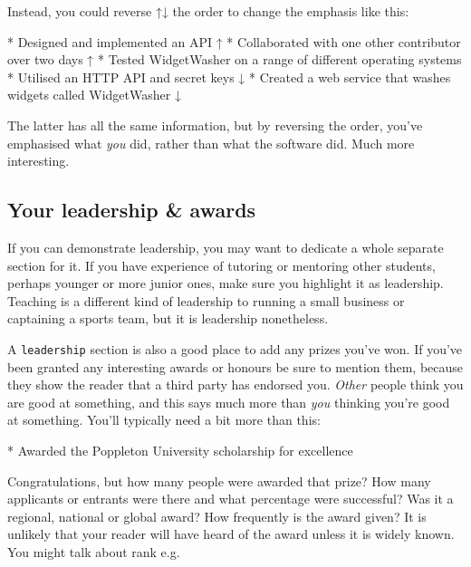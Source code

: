 \documentclass[
]{book}
\newenvironment{Shaded}{\begin{snugshade}}{\end{snugshade}}
\newcommand{\NormalTok}[1]{#1}
\newcommand{\SpecialStringTok}[1]{\textcolor[rgb]{0.31,0.60,0.02}{#1}}
\begin{document}
Instead, you could reverse ↑↓ the order to change the emphasis like this:

\begin{Shaded}
\begin{Highlighting}[]
\SpecialStringTok{* }\NormalTok{Designed and implemented an API ↑}
\SpecialStringTok{* }\NormalTok{Collaborated with one other contributor over two days ↑}
\SpecialStringTok{* }\NormalTok{Tested WidgetWasher on a range of different operating systems}
\SpecialStringTok{* }\NormalTok{Utilised an HTTP API and secret keys ↓}
\SpecialStringTok{* }\NormalTok{Created a web service that washes widgets called WidgetWasher ↓}
\end{Highlighting}
\end{Shaded}

The latter has all the same information, but by reversing the order, you've emphasised what \emph{you} did, rather than what the software did. Much more interesting. 💪

\hypertarget{prizes}{%
\subsection{Your leadership \& awards}\label{prizes}}

If you can demonstrate leadership, you may want to dedicate a whole separate section for it. If you have experience of tutoring or mentoring other students, perhaps younger or more junior ones, make sure you highlight it as leadership. Teaching is a different kind of leadership to running a small business or captaining a sports team, but it is leadership nonetheless.

A \texttt{leadership} section is also a good place to add any prizes you've won. If you've been granted any interesting awards or honours be sure to mention them, because they show the reader that a third party has endorsed you. \emph{Other} people think you are good at something, and this says much more than \emph{you} thinking you're good at something. You'll typically need a bit more than this:

\begin{Shaded}
\begin{Highlighting}[]
\SpecialStringTok{* }\NormalTok{Awarded the Poppleton University scholarship for excellence}
\end{Highlighting}
\end{Shaded}

Congratulations, but how many people were awarded that prize? How many applicants or entrants were there and what percentage were successful? Was it a regional, national or global award? How frequently is the award given? It is unlikely that your reader will have heard of the award unless it is widely known. You might talk about rank e.g.
\end{document}
